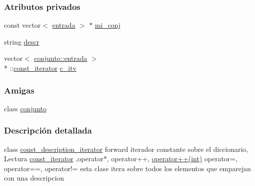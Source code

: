\subsubsection*{Atributos privados}
\begin{DoxyCompactItemize}
\item 
const vector$<$ \hyperlink{classconjunto_a09cad766dd65de73e51eae21f9d22585}{entrada} $>$ $\ast$ \hyperlink{classconjunto_1_1const__description__iterator_a9d24dd6c5eb3171c4543d164d5d152e6}{mi\-\_\-conj}
\item 
string \hyperlink{classconjunto_1_1const__description__iterator_a46a1e768efcf3886d1ab9063b76dcbe7}{descr}
\item 
vector$<$ \hyperlink{classconjunto_a09cad766dd65de73e51eae21f9d22585}{conjunto\-::entrada} $>$\\*
\-::\hyperlink{classconjunto_1_1const__iterator}{const\-\_\-iterator} \hyperlink{classconjunto_1_1const__description__iterator_a41cc62c64850c507f4d6bbed318d8949}{c\-\_\-itv}
\end{DoxyCompactItemize}
\subsubsection*{Amigas}
\begin{DoxyCompactItemize}
\item 
class \hyperlink{classconjunto_1_1const__description__iterator_a42fdcda39c77eabd7380e29fcdbe5dd2}{conjunto}
\end{DoxyCompactItemize}


\subsubsection{Descripción detallada}
class \hyperlink{classconjunto_1_1const__description__iterator}{const\-\_\-description\-\_\-iterator} forward iterador constante sobre el diccionario, Lectura \hyperlink{classconjunto_1_1const__iterator}{const\-\_\-iterator} ,operator$\ast$, operator++, \hyperlink{classconjunto_1_1const__description__iterator_a6e102f59a677e3bf43aec62609531b11}{operator++(int)} operator=, operator==, operator!= esta clase itera sobre todos los elementos que emparejan con una descripcion 

